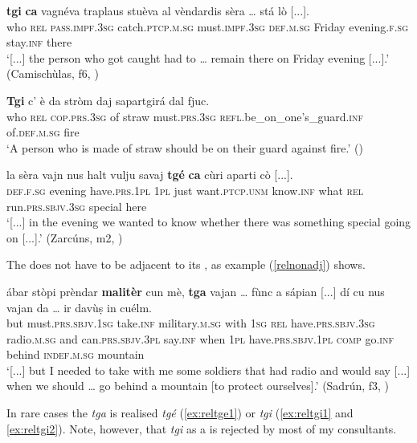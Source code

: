 \ea\label{ex:relca1}
\gll    [...] \textbf{tgi} \textbf{ca} vagnéva traplaus stuèva al vèndardis sèra … stá lò [...].\\
{}  who \textsc{rel} \textsc{pass.impf.3sg} catch.\textsc{ptcp.m.sg} must.\textsc{impf.3sg} \textsc{def.m.sg} Friday evening.\textsc{f.sg} {} stay.\textsc{inf} there\\
\glt `[...] the person who got caught had to … remain there on Friday evening [...].' (Camischùlas, f6, )
\z

\ea\label{ex:relca2}
\gll   \textbf{Tgi} {c}’ è da stròm daj sapartgirá dal fjuc.\\
     who \textsc{rel} \textsc{cop.prs.3sg} of straw must.\textsc{prs.3sg} \textsc{refl}.be\_on\_one’s\_guard.\textsc{inf} of.\textsc{def.m.sg} fire\\
\glt `A person who is made of straw should be on their guard against fire.' ()
\z

\ea
\label{ex:relca3}
\gll [...] la sèra vajn nus halt vulju savaj \textbf{tgé} \textbf{ca} cùri aparti cò [...].\\
{} \textsc{def.f.sg} evening have.\textsc{prs.1pl} \textsc{1pl} just want.\textsc{ptcp.unm} know.\textsc{inf} what \textsc{rel} run.\textsc{prs.sbjv.3sg} special here\\
\glt `[...] in the evening we wanted to know whether there was something special going on [...].' (Zarcúns, m2, )
\z

The  does not have to be adjacent to its , as example (\ref{relnonadj}) shows.

\ea
\label{relnonadj}
\gll  [...] ábar stòpi prèndar \textbf{malitèr} cun mè, \textbf{tga} vajan … fùnc a sápian [...] dí cu nus vajan da … ir davùṣ in cuélm.\\
{} but must.\textsc{prs.sbjv.1sg} take.\textsc{inf} military.\textsc{m.sg} with \textsc{1sg} \textsc{rel} have.\textsc{prs.sbjv.3sg} {} radio.\textsc{m.sg} and can.\textsc{prs.sbjv.3pl} {} say.\textsc{inf} when \textsc{1pl} have.\textsc{prs.sbjv.1pl} \textsc{comp} {} go.\textsc{inf} behind \textsc{indef.m.sg} mountain\\
\glt `[...] but I needed to take with me some soldiers that had radio and would say [...] when we should … go behind a mountain [to protect ourselves].' (Sadrún, f3, )
\z

In rare cases the  \textit{tga} is realised \textit{tgé} (\ref{ex:reltge1}) or \textit{tgi} (\ref{ex:reltgi1} and \ref{ex:reltgi2}). Note, however, that \textit{tgi} as a  is rejected by most of my consultants.

